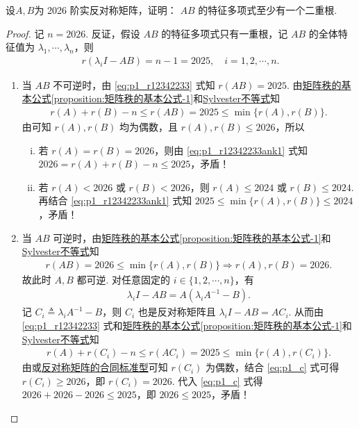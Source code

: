 \documentclass[../../main.tex]{subfiles}%
\begin{document}
\begin{example}
设$A, B$为 2026 阶实反对称矩阵，证明：
$AB$ 的特征多项式至少有一个二重根.
\end{example}
\begin{proof}
记 \(n=2026\). 反证，假设 \(AB\) 的特征多项式只有一重根，记 \(AB\) 的全体特征值为 \(\lambda_1,\cdots,\lambda_n\)，则
\begin{align}
r(\lambda_i I - AB) = n-1 = 2025,\quad i=1,2,\cdots,n. \label{eq:p1_r12342233}
\end{align}
\begin{enumerate}[(1)]
\item 当 \(AB\) 不可逆时，由 \eqref{eq:p1_r12342233} 式知 \(r(AB)=2025\). 由\hyperref[proposition:矩阵秩的基本公式-1]{矩阵秩的基本公式\ref{proposition:矩阵秩的基本公式-1}}和\hyperref[proposition:Sylvester(西尔维斯特)不等式]{Sylvester不等式}知
\begin{align}
r(A)+r(B)-n \leqslant r(AB) = 2025 \leqslant \min\{r(A), r(B)\}. \label{eq:p1_r12342233ank1}
\end{align}
由可知 \(r(A), r(B)\) 均为偶数，且 \(r(A), r(B) \leqslant 2026\)，所以
\begin{enumerate}[(i)]
\item 若 \(r(A)=r(B)=2026\)，则由 \eqref{eq:p1_r12342233ank1} 式知 \(2026 = r(A)+r(B)-n \leqslant 2025\)，矛盾！
\item 若 \(r(A)<2026\) 或 \(r(B)<2026\)，则 \(r(A) \leqslant 2024\) 或 \(r(B) \leqslant 2024\). 再结合 \eqref{eq:p1_r12342233ank1} 式知 \(2025 \leqslant \min\{r(A), r(B)\} \leqslant 2024\)，矛盾！
\end{enumerate}

\item 当 \(AB\) 可逆时，由\hyperref[proposition:矩阵秩的基本公式-1]{矩阵秩的基本公式\ref{proposition:矩阵秩的基本公式-1}}和\hyperref[proposition:Sylvester(西尔维斯特)不等式]{Sylvester不等式}知
\begin{align}
r(AB) = 2026 \leqslant \min\{r(A), r(B)\} \Longrightarrow r(A), r(B) = 2026. \label{eq:p1_r12342233ank2}
\end{align}
故此时 \(A, B\) 都可逆. 对任意固定的 \(i \in \{1, 2, \cdots, n\}\)，有
\begin{align*}
\lambda_i I - AB = A(\lambda_i A^{-1} - B).
\end{align*}
记 \(C_i \triangleq \lambda_i A^{-1} - B\)，则 \(C_i\) 也是反对称矩阵且 \(\lambda_i I - AB = AC_i\). 从而由 \eqref{eq:p1_r12342233} 式和\hyperref[proposition:矩阵秩的基本公式-1]{矩阵秩的基本公式\ref{proposition:矩阵秩的基本公式-1}}和\hyperref[proposition:Sylvester(西尔维斯特)不等式]{Sylvester不等式}知
\begin{align}
r(A) + r(C_i) - n \leqslant r(AC_i) = 2025 \leqslant \min\{r(A), r(C_i)\}. \label{eq:p1_c}
\end{align}
由或\hyperref[theorem:反对称矩阵的合同标准型]{反对称矩阵的合同标准型}可知 \(r(C_i)\) 为偶数，结合 \eqref{eq:p1_c} 式可得 \(r(C_i) \geqslant 2026\)，即 \(r(C_i)=2026\). 代入 \eqref{eq:p1_c} 式得 \(2026+2026-2026 \leqslant 2025\)，即 \(2026 \leqslant 2025\)，矛盾！
\end{enumerate}
\end{proof}
\end{document}
